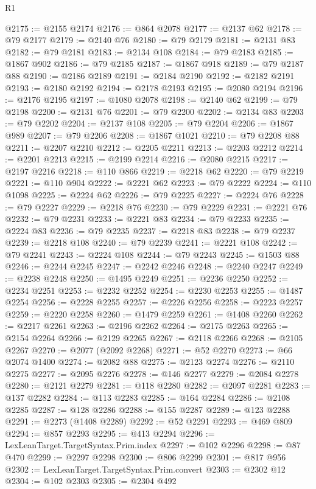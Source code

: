 \begin{lexlean}{R1}
\begin{coremodule}
@2175 := @2155 @2174
@2176 := @864 @2078
@2177 := @2137 @62
@2178 := @79 @2177
@2179 := @2140 @76
@2180 := @79 @2179
@2181 := @2131 @83
@2182 := @79 @2181
@2183 := @2134 @108
@2184 := @79 @2183
@2185 := @1867 @902
@2186 := @79 @2185
@2187 := @1867 @918
@2189 := @79 @2187 @88
@2190 := @2186 @2189
@2191 := @2184 @2190
@2192 := @2182 @2191
@2193 := @2180 @2192
@2194 := @2178 @2193
@2195 := @2080 @2194
@2196 := @2176 @2195
@2197 := @1080 @2078
@2198 := @2140 @62
@2199 := @79 @2198
@2200 := @2131 @76
@2201 := @79 @2200
@2202 := @2134 @83
@2203 := @79 @2202
@2204 := @2137 @108
@2205 := @79 @2204
@2206 := @1867 @989
@2207 := @79 @2206
@2208 := @1867 @1021
@2210 := @79 @2208 @88
@2211 := @2207 @2210
@2212 := @2205 @2211
@2213 := @2203 @2212
@2214 := @2201 @2213
@2215 := @2199 @2214
@2216 := @2080 @2215
@2217 := @2197 @2216
@2218 := @110 @866
@2219 := @2218 @62
@2220 := @79 @2219
@2221 := @110 @904
@2222 := @2221 @62
@2223 := @79 @2222
@2224 := @110 @1098
@2225 := @2224 @62
@2226 := @79 @2225
@2227 := @2224 @76
@2228 := @79 @2227
@2229 := @2218 @76
@2230 := @79 @2229
@2231 := @2221 @76
@2232 := @79 @2231
@2233 := @2221 @83
@2234 := @79 @2233
@2235 := @2224 @83
@2236 := @79 @2235
@2237 := @2218 @83
@2238 := @79 @2237
@2239 := @2218 @108
@2240 := @79 @2239
@2241 := @2221 @108
@2242 := @79 @2241
@2243 := @2224 @108
@2244 := @79 @2243
@2245 := @1503 @88
@2246 := @2244 @2245
@2247 := @2242 @2246
@2248 := @2240 @2247
@2249 := @2238 @2248
@2250 := @1495 @2249
@2251 := @2236 @2250
@2252 := @2234 @2251
@2253 := @2232 @2252
@2254 := @2230 @2253
@2255 := @1487 @2254
@2256 := @2228 @2255
@2257 := @2226 @2256
@2258 := @2223 @2257
@2259 := @2220 @2258
@2260 := @1479 @2259
@2261 := @1408 @2260
@2262 := @2217 @2261
@2263 := @2196 @2262
@2264 := @2175 @2263
@2265 := @2154 @2264
@2266 := @2129 @2265
@2267 := @2118 @2266
@2268 := @2105 @2267
@2270 := @2077 (@2092 @2268)
@2271 := @52 @2270
@2273 := @66 @2074 @1400
@2274 := @2082 @88
@2275 := @2123 @2274
@2276 := @2110 @2275
@2277 := @2095 @2276
@2278 := @146 @2277
@2279 := @2084 @2278
@2280 := @2121 @2279
@2281 := @118 @2280
@2282 := @2097 @2281
@2283 := @137 @2282
@2284 := @113 @2283
@2285 := @164 @2284
@2286 := @2108 @2285
@2287 := @128 @2286
@2288 := @155 @2287
@2289 := @123 @2288
@2291 := @2273 (@1408 @2289)
@2292 := @52 @2291
@2293 := @469 @809
@2294 := @857 @2293
@2295 := @413 @2294
@2296 := LexLeanTarget.TargetSyntax.Prim.index
@2297 := @102 @2296
@2298 := @87 @470
@2299 := @2297 @2298
@2300 := @806 @2299
@2301 := @817 @956
@2302 := LexLeanTarget.TargetSyntax.Prim.convert
@2303 := @2302 @12
@2304 := @102 @2303
@2305 := @2304 @492

\end{coremodule}
\end{lexlean}
